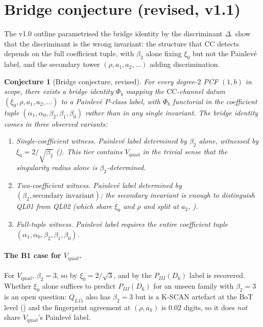 \documentclass[11pt,reqno]{amsart}
\theoremstyle{plain}
\newtheorem{conjecture}[theorem]{Conjecture}
\theoremstyle{definition}
\theoremstyle{remark}
\newcommand{\CC}{\mathrm{CC}}
\newcommand{\Vquad}{V_{\mathrm{quad}}}
\begin{document}
\section{Bridge conjecture (revised, v1.1)}
\label{sec:bridge}

The v1.0 outline parametrised the bridge identity by the
discriminant $\Delta$.  show
that the discriminant is the wrong invariant: the structure
that $\CC$ detects depends on the full coefficient tuple, with
$\beta_2$ alone fixing $\xi_0$ but not the Painlev\'e label,
and the secondary tower $(\rho, a_1, a_2, \ldots)$ adding
discrimination.

\begin{conjecture}[Bridge conjecture, revised]
\label{conj:bridge}
For every degree-$2$ PCF $(1, b)$ in scope, there exists a
\emph{bridge identity} $\Phi_b$ mapping the $\CC$-channel
datum $(\xi_0, \rho, a_1, a_2, \ldots)$ to a Painlev\'e
$P$-class label, with $\Phi_b$ functorial in the coefficient
tuple $(\alpha_1, \alpha_0, \beta_2, \beta_1, \beta_0)$
rather than in any single invariant.
The bridge identity comes in three observed variants:
\begin{enumerate}[label=B\arabic*.]
\item \emph{Single-coefficient witness.} Painlev\'e label
determined by $\beta_2$ alone, witnessed by
$\xi_0 = 2/\sqrt{\beta_2}$ (). This tier
contains $\Vquad$ in the trivial sense that the
\emph{singularity radius} alone is $\beta_2$-determined.
\item \emph{Two-coefficient witness.} Painlev\'e label
determined by $(\beta_2, \text{secondary invariant})$;
the secondary invariant is enough to distinguish QL01 from
QL02 (which share $\xi_0$ and $\rho$ and split at $a_2$,
).
\item \emph{Full-tuple witness.} Painlev\'e label requires
the entire coefficient tuple
$(\alpha_1, \alpha_0, \beta_2, \beta_1, \beta_0)$.
\end{enumerate}
\end{conjecture}

\paragraph{The B1 case for $\Vquad$.} For $\Vquad$,
$\beta_2 = 3$, so by  $\xi_0 = 2/\sqrt 3$,
and by  the $P_{III}(D_6)$ label is
recovered. Whether $\xi_0$ alone suffices to predict
$P_{III}(D_6)$ for an unseen family with $\beta_2 = 3$ is
an open question: $Q_{L15}$ also has $\beta_2 = 3$ but is a
K-SCAN artefact at the BoT level () and the
fingerprint agreement at $(\rho, a_k)$ is $0.02$ digits, so
it does \emph{not} share $\Vquad$'s Painlev\'e label.
\end{document}
